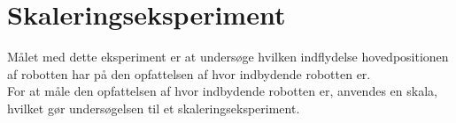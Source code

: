 \chapter*{Skaleringseksperiment}
%
Målet med dette eksperiment er at undersøge hvilken indflydelse hovedpositionen af robotten har på den opfattelsen af hvor indbydende robotten er. 
\\
For at måle den opfattelsen af hvor indbydende robotten er, anvendes en skala, hvilket gør undersøgelsen til et skaleringseksperiment. 
 

